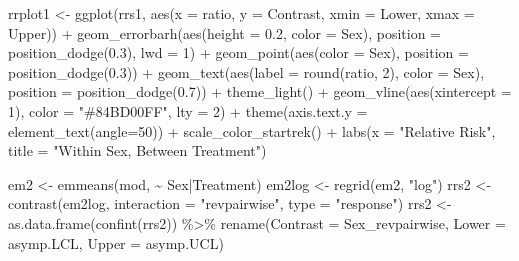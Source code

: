 \documentclass[12pt]{article}
\newenvironment{Shaded}{\begin{snugshade}}{\end{snugshade}}
\newcommand{\AttributeTok}[1]{\textcolor[rgb]{0.77,0.63,0.00}{#1}}
\newcommand{\DecValTok}[1]{\textcolor[rgb]{0.00,0.00,0.81}{#1}}
\newcommand{\FloatTok}[1]{\textcolor[rgb]{0.00,0.00,0.81}{#1}}
\newcommand{\FunctionTok}[1]{\textcolor[rgb]{0.00,0.00,0.00}{#1}}
\newcommand{\NormalTok}[1]{#1}
\newcommand{\OtherTok}[1]{\textcolor[rgb]{0.56,0.35,0.01}{#1}}
\newcommand{\SpecialCharTok}[1]{\textcolor[rgb]{0.00,0.00,0.00}{#1}}
\newcommand{\StringTok}[1]{\textcolor[rgb]{0.31,0.60,0.02}{#1}}
\begin{document}
\begin{Shaded}
\begin{Highlighting}[]
\NormalTok{rrplot1 }\OtherTok{\textless{}{-}} \FunctionTok{ggplot}\NormalTok{(rrs1, }\FunctionTok{aes}\NormalTok{(}\AttributeTok{x =}\NormalTok{ ratio, }\AttributeTok{y =}\NormalTok{ Contrast, }\AttributeTok{xmin =}\NormalTok{ Lower, }\AttributeTok{xmax =}\NormalTok{ Upper)) }\SpecialCharTok{+}
  \FunctionTok{geom\_errorbarh}\NormalTok{(}\FunctionTok{aes}\NormalTok{(}\AttributeTok{height =} \FloatTok{0.2}\NormalTok{, }\AttributeTok{color =}\NormalTok{ Sex),}
                 \AttributeTok{position =} \FunctionTok{position\_dodge}\NormalTok{(}\FloatTok{0.3}\NormalTok{), }\AttributeTok{lwd =} \DecValTok{1}\NormalTok{) }\SpecialCharTok{+}
  \FunctionTok{geom\_point}\NormalTok{(}\FunctionTok{aes}\NormalTok{(}\AttributeTok{color =}\NormalTok{ Sex), }\AttributeTok{position =} \FunctionTok{position\_dodge}\NormalTok{(}\FloatTok{0.3}\NormalTok{)) }\SpecialCharTok{+}
  \FunctionTok{geom\_text}\NormalTok{(}\FunctionTok{aes}\NormalTok{(}\AttributeTok{label =} \FunctionTok{round}\NormalTok{(ratio, }\DecValTok{2}\NormalTok{), }\AttributeTok{color =}\NormalTok{ Sex), }
            \AttributeTok{position =} \FunctionTok{position\_dodge}\NormalTok{(}\FloatTok{0.7}\NormalTok{)) }\SpecialCharTok{+}
  \FunctionTok{theme\_light}\NormalTok{() }\SpecialCharTok{+}
  \FunctionTok{geom\_vline}\NormalTok{(}\FunctionTok{aes}\NormalTok{(}\AttributeTok{xintercept =} \DecValTok{1}\NormalTok{), }\AttributeTok{color =} \StringTok{"\#84BD00FF"}\NormalTok{, }\AttributeTok{lty =} \DecValTok{2}\NormalTok{) }\SpecialCharTok{+}
  \FunctionTok{theme}\NormalTok{(}\AttributeTok{axis.text.y =} \FunctionTok{element\_text}\NormalTok{(}\AttributeTok{angle=}\DecValTok{50}\NormalTok{)) }\SpecialCharTok{+}
  \FunctionTok{scale\_color\_startrek}\NormalTok{() }\SpecialCharTok{+}
  \FunctionTok{labs}\NormalTok{(}\AttributeTok{x =} \StringTok{"Relative Risk"}\NormalTok{,}
       \AttributeTok{title =} \StringTok{"Within Sex, Between Treatment"}\NormalTok{)}

\NormalTok{em2 }\OtherTok{\textless{}{-}} \FunctionTok{emmeans}\NormalTok{(mod, }\SpecialCharTok{\textasciitilde{}}\NormalTok{ Sex}\SpecialCharTok{|}\NormalTok{Treatment)}
\NormalTok{em2log }\OtherTok{\textless{}{-}} \FunctionTok{regrid}\NormalTok{(em2, }\StringTok{"log"}\NormalTok{)}
\NormalTok{rrs2 }\OtherTok{\textless{}{-}} \FunctionTok{contrast}\NormalTok{(em2log, }\AttributeTok{interaction =} \StringTok{"revpairwise"}\NormalTok{, }\AttributeTok{type =} \StringTok{"response"}\NormalTok{)}
\NormalTok{rrs2 }\OtherTok{\textless{}{-}} \FunctionTok{as.data.frame}\NormalTok{(}\FunctionTok{confint}\NormalTok{(rrs2)) }\SpecialCharTok{\%\textgreater{}\%}
  \FunctionTok{rename}\NormalTok{(}\AttributeTok{Contrast =}\NormalTok{ Sex\_revpairwise, }\AttributeTok{Lower =}\NormalTok{ asymp.LCL, }\AttributeTok{Upper =}\NormalTok{ asymp.UCL)}


\end{Highlighting}
\end{Shaded}
\end{document}
